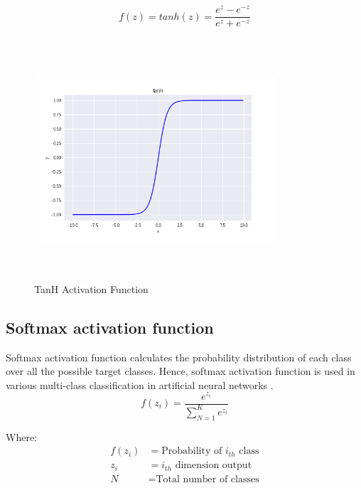 \begin{equation}\label{eq:tanh}
f(z) = tanh(z)=\frac{e^{z}-e^{-z}}{e^{z}+e^{-z}}
\end{equation}
\begin{figure}[h]
\centering
\includegraphics[width=9cm, height=9cm, keepaspectratio]{pics/tanh_10.png}
\caption{TanH Activation Function}
\label{fig:tanh}
\end{figure} 

\subsection*{Softmax activation function}
Softmax activation function calculates the probability distribution of each class over all the possible target classes. Hence, softmax activation function is used in various multi-class classification in artificial neural networks \cite{wu2016deep}.
\begin{equation}\label{eq:softmax}
f(z_{i}) =\frac{e^{z_{i}}}{\sum_{N=1}^{K} e^{z_{i}} }     
\end{equation}

Where:
\begin{align*}
    f(z_{i}) &= \text{Probability of $i_{th}$ class}\\
    z_{i} &= \text{$i_{th}$ dimension output}\\
    N &= \text{Total number of classes}\\
\end{align*}

